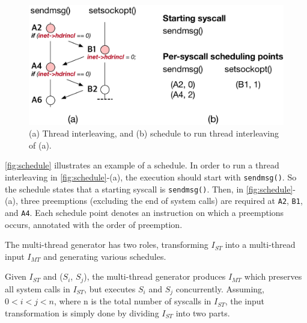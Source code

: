 \begin{figure}[t]
  \centering
  \includegraphics[width=0.75\linewidth]{fig/schedule.pdf}
  \caption{(a) Thread interleaving, and (b) schedule to run thread
    interleaving of (a).}
  \label{fig:schedule}
\end{figure}

\autoref{fig:schedule} illustrates an example of a schedule. In order
to run a thread interleaving in \autoref{fig:schedule}-(a), the
execution should start with \texttt{sendmsg()}. So the schedule states
that a starting syscall is \texttt{sendmsg()}.
%
Then, in \autoref{fig:schedule}-(a), three preemptions (excluding the
end of system calls) are required at \texttt{A2}, \texttt{B1}, and
\texttt{A4}. Each schedule point denotes an instruction on which a
preemptions occurs, annotated with the order of preemption.






%
%
%
%
%
The multi-thread generator has two roles, transforming $I_{ST}$ into a
multi-thread input $I_{MT}$ and generating various schedules.





%   
%
Given $I_{ST}$ and ($S_i$, $S_j$), the multi-thread generator produces
$I_{MT}$ which preserves all system calls in $I_{ST}$, but executes
$S_i$ and $S_j$ concurrently.
%
Assuming, $0 < i < j < n$, where n is the total number of syscalls in
$I_{ST}$, the input transformation is simply done by dividing
$I_{ST}$ into two parts.

